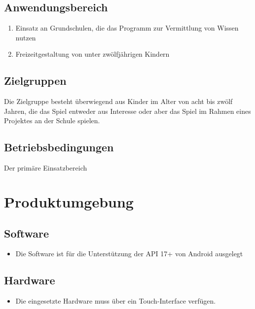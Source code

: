 \documentclass{scrartcl}
\begin{document}
\subsection{Anwendungsbereich}

\begin{enumerate}
	\item Einsatz an Grundschulen, die das Programm zur Vermittlung von Wissen nutzen
	\item Freizeitgestaltung von unter zwölfjährigen Kindern
\end{enumerate}

\subsection{Zielgruppen}

Die Zielgruppe besteht überwiegend aus Kinder im Alter von acht bis zwölf Jahren, die das Spiel entweder aus Interesse oder aber das Spiel im Rahmen eines Projektes an der Schule spielen.

\subsection{Betriebsbedingungen}

Der primäre Einsatzbereich 

\clearpage








\section{Produktumgebung}

\subsection{Software}

\begin{itemize}
	\item Die Software ist für die Unterstützung der API 17+ von Android ausgelegt
\end{itemize}

\subsection{Hardware}

\begin{itemize}
	\item Die eingesetzte Hardware muss über ein Touch-Interface verfügen.
\end{itemize}
\end{document}

